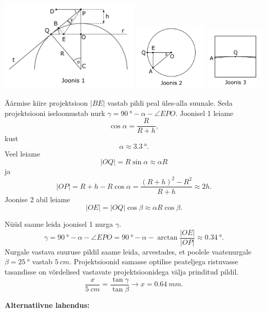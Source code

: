 \begin{center}
\includegraphics[width=0.50\textwidth]{2019-lahg-10-sol1.png}
\includegraphics[width=0.265\textwidth]{2019-lahg-10-sol2.png}
\includegraphics[width=0.215\textwidth]{2019-lahg-10-sol3.png}
\end{center}

Äärmise kiire projektsioon $|BE|$ vastab pildi peal üles-alla suunale. Seda projektsiooni iseloomustab nurk $\gamma=\SI{90}{\degree}-\alpha -\angle EPO$. 
Joonisel 1 leiame $$\cos{\alpha}=\frac{R}{R+h},$$ kust $$\alpha\approx\SI{3.3}{\degree}.$$ Veel leiame $$|OQ|=R\sin{\alpha}\approx \alpha R$$ ja
\[
|OP|=R+h-R\cos{\alpha}=\frac{(R+h)^2 - R^2}{R+h}\approx 2h.
\]
Joonise 2 abil leiame $$|OE|=|OQ|\cos{\beta}\approx \alpha R\cos{\beta}.$$

Nüüd saame leida joonisel 1 nurga $\gamma$.
$$\gamma = \SI{90}{\degree}-\alpha-\angle EPO = \SI{90}{\degree}-\alpha-\arctan{\frac{|OE|}{|OP|}}\approx \SI{0.34}{\degree}.$$
Nurgale vastava suuruse pildil saame leida, arvestades, et poolele vaatenurgale $\beta=\SI{25}{\degree}$ vastab $\SI{5}{cm}$. Projektsioonid samasse optilise peateljega ristuvasse tasandisse on võrdelised vastavate projektsioonidega välja prinditud pildil. $$\frac{x}{\SI{5}{cm}}=\frac{\tan{\gamma}}{\tan{\beta}} \rightarrow x = \SI{0.64}{mm}.$$

\textbf{Alternatiivne lahendus:}

